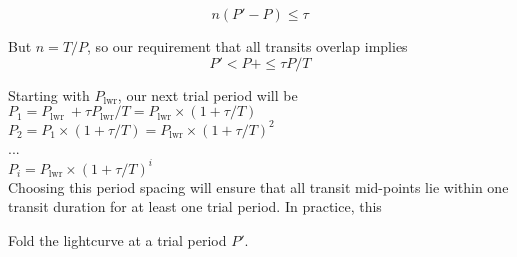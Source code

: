 \documentclass[iop,revtex4,twocolappendix]{emulateapj}
\newcommand{\Plwr}{\ensuremath{P_{\mathrm{lwr}}}}
\begin{document}
$$
n(P'-P) \leq \tau
$$

But $n = T/P$, so our requirement that all transits overlap implies
$$
P' < P + \leq \tau P/T
$$

Starting with \Plwr, our next trial period will be
\noindent
$P_1 = \Plwr\ + \tau \Plwr/T = \Plwr \times (1+ \tau/T)$\\
$P_2 = P_1\times (1+ \tau/T) = \Plwr \times (1+ \tau/T)^2$\\
...\\
$P_{i} = \Plwr \times (1+\tau/T)^i$\\


Choosing this period spacing will ensure that all transit mid-points lie within one transit duration for at least one trial period. In practice, this 







Fold the lightcurve at a trial period $P'$. 
\end{document}
